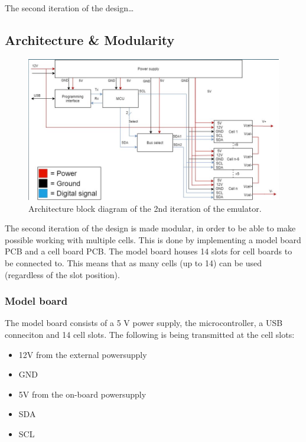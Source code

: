 \IEEEPARstart
{T}{he} second iteration of the design\dots

\subsection{Architecture \& Modularity}

\begin{figure}[h]
    \centering
    \includegraphics[scale=0.5]{architecture_2nd_iteration.png}
    \caption{Architecture block diagram of the 2nd iteration of the emulator.}
\end{figure}

The second iteration of the design is made modular, in order to be able to make 
possible working with multiple cells. This is done by implementing a model board
PCB and a cell board PCB. The model board houses 14 slots for cell boards to be 
connected to. This means that as many cells (up to 14) can be used (regardless 
of the slot position).

    \subsubsection{Model board}
    The model board consists of a 5 V power supply, the microcontroller, a USB 
    conneciton and 14 cell slots. The following is being transmitted at the
    cell slots:

    \begin{itemize}
        \item 12V from the external powersupply
        \item GND
        \item 5V from the on-board powersupply
        \item SDA
        \item SCL
    \end{itemize}

